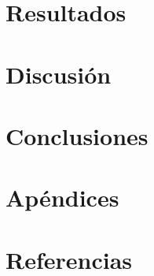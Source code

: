 \documentclass[a4paper]{article}
\begin{document}
\clearpage

\section{Resultados}

\vspace{0.5cm}

\clearpage

\section{Discusión}

\vspace{0.5cm}

\clearpage

\section{Conclusiones}

\vspace{0.5cm}

\clearpage

\section{Apéndices}

\vspace{0.5cm}

\clearpage

\section{Referencias}

\vspace{0.5cm}
\end{document}
